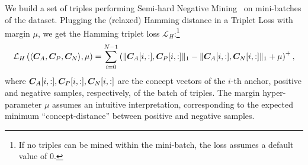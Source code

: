 %
We build a set of triples performing Semi-hard Negative Mining~\cite{schroff2015facenet} on mini-batches of the dataset. 
Plugging the (relaxed) Hamming distance in a Triplet Loss with margin $\mu$, we get the Hamming triplet loss $\mathcal{L}_H$:\footnote{If no triples can be mined within the mini-batch, the loss assumes a default value of 0.} 
\begin{equation*}
	\mathcal{L}_H\left(\langle{\bm{C}}_A, {\bm{C}}_P, {\bm{C}}_N\rangle, \mu\right) = \sum_{i = 0}^{N-1} \left(\|{\bm{C}}_A[i,:], {\bm{C}}_P[i,:]\|_1 - \|{\bm{C}}_A[i,:], {\bm{C}}_N[i,:]\|_1 + \mu\right)^+,
\end{equation*}
where ${\bm{C}}_A[i,:], {\bm{C}}_P[i,:], {\bm{C}}_N[i,:]$ are the concept vectors of the $i$-th anchor, positive and negative samples, respectively, of the batch of triples.
The margin hyper-parameter $\mu$ assumes an intuitive interpretation, corresponding to the expected minimum ``concept-distance'' between positive and negative samples.

